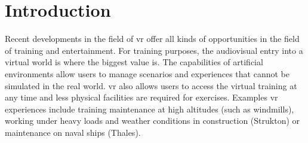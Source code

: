 \section{Introduction}
Recent developments in the field of \acrfull{vr} offer all kinds of opportunities in the field of training
and entertainment. For training purposes, the audiovisual entry into a virtual world is where the biggest value is.
The capabilities of artificial environments allow users to manage scenarios and 
experiences that cannot be simulated in the real world. \acrshort{vr} also allows users to access the virtual training at any time
and less physical facilities are required for exercises. 
Examples \acrshort{vr} experiences include training maintenance at high altitudes (such as windmills), working under heavy loads and weather conditions in construction (Strukton) or maintenance on naval ships (Thales).